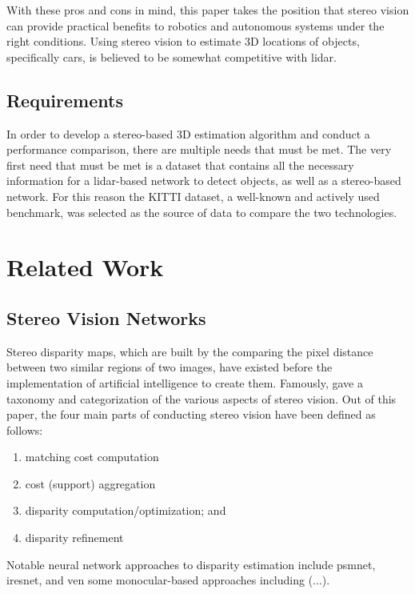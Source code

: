 With these pros and cons in mind, this paper takes the position that stereo vision can provide practical benefits to robotics and autonomous systems under the right conditions. Using stereo vision to estimate 3D locations of objects, specifically cars, is believed to be somewhat competitive with lidar.


\subsection{Requirements}
In order to develop a stereo-based 3D estimation algorithm and conduct a performance comparison, there are multiple needs that must be met. The very first need that must be met is a dataset that contains all the necessary information for a lidar-based network to detect objects, as well as a stereo-based network. For this reason the KITTI dataset, a well-known and actively used benchmark, was selected as the source of data to compare the two technologies.

\section{Related Work}
\subsection{Stereo Vision Networks}
Stereo disparity maps, which are built by the comparing the pixel distance between two similar regions of two images, have existed before the implementation of artificial intelligence to create them. Famously, \cite{scharstein_taxonomy_2002} gave a taxonomy and categorization of the various aspects of stereo vision. Out of this paper, the four main parts of conducting stereo vision have been defined as follows:

\begin{enumerate} \itemsep=-0.5em
    \item matching cost computation
    \item cost (support) aggregation
    \item disparity computation/optimization; and
    \item disparity refinement
\end{enumerate}

Notable neural network approaches to disparity estimation include psmnet, iresnet, and ven some monocular-based approaches including (...).

